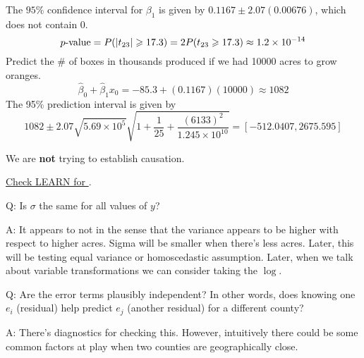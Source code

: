 \begin{example}
    The $ 95\% $ confidence interval for $ \beta_1 $ is given by
    $ 0.1167\pm 2.07(0.00676) $,
    which does not contain $ 0 $.
    \[ p\text{-value}=P(\lvert t_{23}\rvert\geqslant 17.3)=
        2P(t_{23}\geqslant 17.3)\approx 1.2\times 10^{-14} \]
    Predict the \# of boxes in thousands produced if we had
    10000 acres to grow oranges.
    \[ \hat{\beta}_0+\hat{\beta}_1x_0=-85.3+(0.1167)(10000)\approx 1082 \]
    The 95\% prediction interval is given by
    \[ 1082\pm 2.07\sqrt{5.69\times 10^5}\sqrt{1+\frac{1}{25}+
        \frac{(6133)^2}{1.245\times 10^{10}} }=
            [-512.0407, 2675.595] \]
    \begin{remark}
        We are \textbf{not} trying to establish causation.
    \end{remark}
\end{example}


\underline{Check LEARN for }.



Q\@: Is $ \sigma $ the same for all values of $ y $?

A\@: It appears to not in the sense that the variance
appears to be higher with respect to higher acres.
Sigma will be smaller when there's less acres.
Later, this will be testing equal variance or homoscedastic
assumption. Later, when we talk about variable
transformations we can consider taking the $ \log $.

Q\@: Are the error terms plausibly independent?
In other words,
does knowing one $ e_i $ (residual) help predict $ e_j $
(another residual) for a different county?

A\@: There's diagnostics for checking this. However,
intuitively there could be some common factors
at play when two counties are geographically close.

